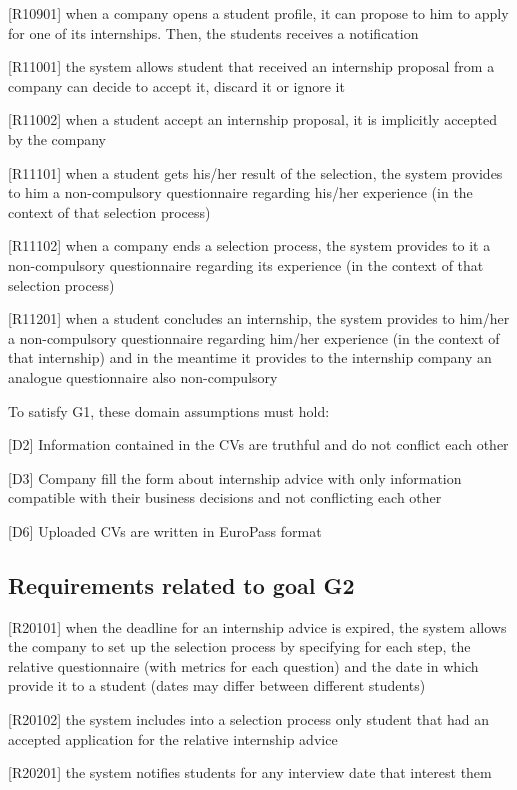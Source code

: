 		[R10901] when a company opens a student profile, it can propose to him to apply for one of its internships. Then, the students receives a notification
		
		[R11001] the system allows student that received an internship proposal from a company can decide to accept it, discard it or ignore it
		
		[R11002] when a student accept an internship proposal, it is implicitly accepted by the company 
		
		[R11101] when a student gets his/her result of the selection, the system provides to him a non-compulsory questionnaire regarding his/her experience (in the context of that selection process)
		
		[R11102] when a company ends a selection process, the system provides to it a non-compulsory questionnaire regarding its experience (in the context of that selection process) 
		
		[R11201] when a student concludes an internship, the system provides to him/her a non-compulsory questionnaire regarding him/her experience (in the context of that internship) and in the meantime it provides to the internship company an analogue questionnaire also non-compulsory 
		
		To satisfy G1, these domain assumptions must hold:
		
	
		[D2] Information contained in the CVs are truthful and do not conflict each other
		
		[D3] Company fill the form about internship advice with only information compatible with their business decisions and not conflicting each other
		
		[D6] Uploaded CVs are written in EuroPass format
		
		\subsection{Requirements related to goal G2}
		
		[R20101] when the deadline for an internship advice is expired, the system allows the company to set up the selection process by specifying for each step, the relative questionnaire (with metrics for each question) and the date in which provide it to a student (dates may differ between different students)
		
		[R20102] the system includes into a selection process only student that had an accepted application for the relative internship advice
		
		[R20201] the system notifies students for any interview date that interest them
		
